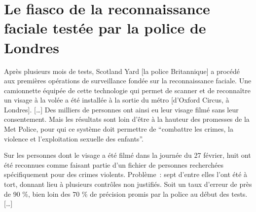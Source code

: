 \section{Le fiasco de la reconnaissance faciale testée par la police de Londres}

Après plusieurs mois de tests, Scotland Yard [la police Britannique] a procédé aux premières opérations de surveillance fondée sur la reconnaissance faciale.
Une camionnette équipée de cette technologie qui permet de scanner et de reconnaître un visage à la volée a été installée à la sortie du métro [d'Oxford Circus, à Londres].
[…]
Des milliers de personnes ont ainsi eu leur visage filmé sans leur consentement.
Mais les résultats sont loin d'être à la hauteur des promesses de la Met Police, pour qui ce système doit permettre de \enquote{combattre les crimes, la violence et l'exploitation sexuelle des enfants}.

Sur les  personnes dont le visage a été filmé dans la journée du 27 février, huit ont été reconnues comme faisant partie d'un fichier de personnes recherchées spécifiquement pour des crimes violents.
Problème : sept d'entre elles l'ont été à tort, donnant lieu à plusieurs contrôles non justifiés.
Soit un taux d'erreur de près de 90 \%, bien loin des 70 \% de précision promis par la police au début des tests.
[…]
